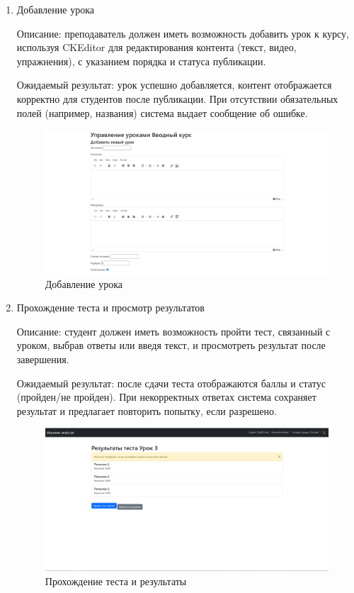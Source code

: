 \begin{enumerate}
	\item Добавление урока
	
Описание: преподаватель должен иметь возможность добавить урок к курсу, используя CKEditor для редактирования контента (текст, видео, упражнения), с указанием порядка и статуса публикации.
	
Ожидаемый результат: урок успешно добавляется, контент отображается корректно для студентов после публикации. При отсутствии обязательных полей (например, названия) система выдает сообщение об ошибке.
	
	\begin{figure}[ht]
		\centering
		\includegraphics[width=1\textwidth]{images/урокдобавить} 
		\caption{Добавление урока}
		\label{urok:image}
	\end{figure}
	\newpage
	\item Прохождение теста и просмотр результатов
	
Описание: студент должен иметь возможность пройти тест, связанный с уроком, выбрав ответы или введя текст, и просмотреть результат после завершения.
	
Ожидаемый результат: после сдачи теста отображаются баллы и статус (пройден/не пройден). При некорректных ответах система сохраняет результат и предлагает повторить попытку, если разрешено.
	
	\begin{figure}[ht]
		\centering
		\includegraphics[width=1\textwidth]{images/тестрез} 
		\caption{Прохождение теста и результаты}
		\label{test:image}
	\end{figure}
	

\end{enumerate}

